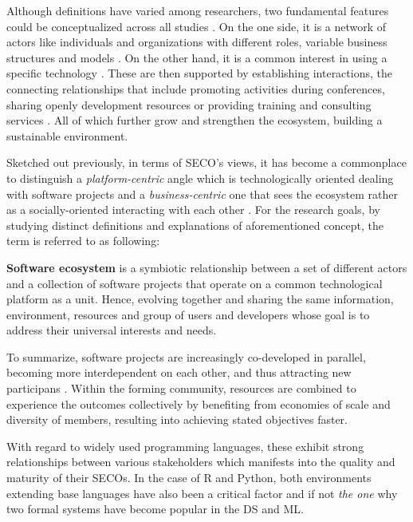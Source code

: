 Although  definitions have varied among researchers, two fundamental features could be conceptualized across all studies \parencite{HansenManikas2013}.
On the one side, it is a network of actors like individuals and organizations with different roles, variable business structures and models \parencite{Joshua2013SoftwareChallenges}.
On the other hand, it is a common interest in using a specific technology \parencite{Christensen2014AnalysisEcosystem}.
These are then supported by establishing interactions, the connecting relationships that include promoting activities during conferences, sharing openly development resources or providing training and consulting services \parencites{HansenManikas2013}{Dhungana2010SoftwareNature}. 
All of which further grow and strengthen the ecosystem, building a sustainable environment.

Sketched out previously, in terms of \ac{SECO}'s views, it has become a commonplace to distinguish a \emph{platform-centric} angle which is technologically oriented dealing with software projects and a \emph{business-centric} one that sees the ecosystem rather as a socially-oriented  interacting with each other \parencites[3]{Franco-Bedoya2017OpenMapping}{Eleni2017}.
For the research goals, by studying distinct definitions and explanations of aforementioned concept, the term is referred to as following:

\begin{displayquote}
\textbf{Software ecosystem} is a symbiotic relationship between a set of different actors and a collection of software projects that operate on a common technological platform as a unit. 
Hence, evolving together and sharing the same information, environment, resources and group of users and developers whose goal is to address their universal interests and needs.
\end{displayquote}

To summarize, software projects are increasingly co-developed in parallel, becoming more interdependent on each other, and thus attracting new participans \parencites{Eleni2017}{Mens2014}.
Within the forming community, resources are combined to experience the outcomes collectively by benefiting from economies of scale and diversity of members, resulting into achieving stated objectives faster.

With regard to widely used programming languages, these exhibit strong relationships between various stakeholders which manifests into the quality and maturity of their \acp{SECO}.
In the case of R and Python, both environments extending base languages have also been a critical factor and if not \emph{the one} why two formal systems have become popular in the \ac{DS} and \ac{ML}. 

